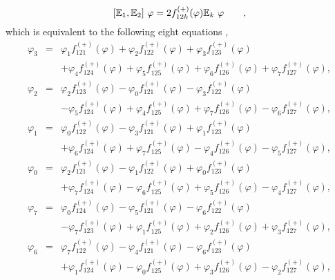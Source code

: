 \documentclass[a4paper,12pt]{book}
\begin{document}
\begin{equation}
\lbrack \Bbb{E}_{1},\Bbb{E}_{2}]{\ \varphi }=2f_{12k}^{(+)}(\varphi )\Bbb{E}%
_{k}{\ \varphi }\qquad ,
\end{equation}
which is equivalent to the following eight equations , 
\begin{eqnarray}
\varphi _{3} &=&\varphi _{1}f_{121}^{(+)}(\varphi )+\varphi
_{2}f_{122}^{(+)}(\varphi )+\varphi _{3}f_{123}^{(+)}(\varphi )  \nonumber \\
&&+\varphi _{4}f_{124}^{(+)}(\varphi )+\varphi _{5}f_{125}^{(+)}(\varphi
)+\varphi _{6}f_{126}^{(+)}(\varphi )+\varphi _{7}f_{127}^{(+)}(\varphi ), 
\nonumber \\
\varphi _{2} &=&\varphi _{2}f_{123}^{(+)}(\varphi )-\varphi
_{0}f_{121}^{(+)}(\varphi )-\varphi _{3}f_{122}^{(+)}(\varphi )  \nonumber \\
&&-\varphi _{5}f_{124}^{(+)}(\varphi )+\varphi _{4}f_{125}^{(+)}(\varphi
)+\varphi _{7}f_{126}^{(+)}(\varphi )-\varphi _{6}f_{127}^{(+)}(\varphi ), 
\nonumber \\
\varphi _{1} &=&\varphi _{0}f_{122}^{(+)}(\varphi )-\varphi
_{3}f_{121}^{(+)}(\varphi )+\varphi _{1}f_{123}^{(+)}(\varphi )  \nonumber \\
&&+\varphi _{6}f_{124}^{(+)}(\varphi )+\varphi _{7}f_{125}^{(+)}(\varphi
)-\varphi _{4}f_{126}^{(+)}(\varphi )-\varphi _{5}f_{127}^{(+)}(\varphi ), 
\nonumber \\
\varphi _{0} &=&\varphi _{2}f_{121}^{(+)}(\varphi )-\varphi
_{1}f_{122}^{(+)}(\varphi )+\varphi _{0}f_{123}^{(+)}(\varphi )  \nonumber \\
&&+\varphi _{7}f_{124}^{(+)}(\varphi )-\varphi _{6}f_{125}^{(+)}(\varphi
)+\varphi _{5}f_{126}^{(+)}(\varphi )-\varphi _{4}f_{127}^{(+)}(\varphi ), 
\nonumber \\
\varphi _{7} &=&\varphi _{0}f_{124}^{(+)}(\varphi )-\varphi
_{5}f_{121}^{(+)}(\varphi )-\varphi _{6}f_{122}^{(+)}(\varphi )  \nonumber \\
&&-\varphi _{7}f_{123}^{(+)}(\varphi )+\varphi _{1}f_{125}^{(+)}(\varphi
)+\varphi _{2}f_{126}^{(+)}(\varphi )+\varphi _{3}f_{127}^{(+)}(\varphi ), 
\nonumber \\
\varphi _{6} &=&\varphi _{7}f_{122}^{(+)}(\varphi )-\varphi
_{4}f_{121}^{(+)}(\varphi )-\varphi _{6}f_{123}^{(+)}(\varphi )  \nonumber \\
&&+\varphi _{1}f_{124}^{(+)}(\varphi )-\varphi _{0}f_{125}^{(+)}(\varphi
)+\varphi _{3}f_{126}^{(+)}(\varphi )-\varphi _{2}f_{127}^{(+)}(\varphi ), 
\nonumber \\

\end{eqnarray}
\end{document}
